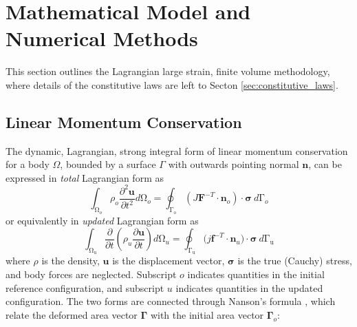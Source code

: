 \documentclass[sn-mathphys,Numbered]{sn-jnl}%
\newcommand{\bb}{\boldsymbol}
\begin{document}
\section{Mathematical Model and Numerical Methods}\label{sec:math_model}

This section outlines the Lagrangian large strain, finite volume methodology, where details of the constitutive laws are left to Secton \ref{sec:constitutive_laws}.

\subsection{Linear Momentum Conservation}

The dynamic, Lagrangian, strong integral form of linear momentum conservation for a body $\Omega$, bounded by a surface $\Gamma$ with outwards pointing normal $\bb{n}$, can be expressed in \emph{total} Lagrangian form as
\begin{equation} \label{eqn:totalLagFormulation}
    \int_{\mathrm{\Omega}_o} \rho_o \frac{\partial^2 \bb{u} }{\partial t^2} d\mathrm{\Omega}_o
    =
    \oint_{\mathrm{\Gamma_o}} \left( J \bb{F}^{-T} \cdot \bb{n}_o \right) \cdot \boldsymbol{\sigma} \ d\mathrm{\Gamma}_o
\end{equation}
or equivalently in \emph{updated} Lagrangian form as
\begin{equation} \label{eqn:updatedLagFormulation}
    \int_{\mathrm{\Omega_u}} \frac{\partial }{\partial t} \left( \rho_u \frac{\partial \bb{u} }{\partial t} \right) d\mathrm{\Omega}_u
    = \oint_{\mathrm{\Gamma_u}}(j\bb{f}^{-T}\cdot{\bb{n}_u)\cdot\boldsymbol{\sigma}}\ d\mathrm{\Gamma_u}
\end{equation}
where $\rho$ is the density, $\bb{u}$ is the displacement vector, $\boldsymbol{\sigma}$ is the true (Cauchy) stress, and body forces are neglected.
Subscript $o$ indicates quantities in the initial reference configuration, and subscript $u$ indicates quantities in the updated configuration.
The two forms are connected through Nanson’s formula \cite{bathe_finite_1996}, which relate the deformed area vector $\bb{\Gamma}$ with the initial area vector $\bb{\Gamma}_{o}$:
\end{document}

